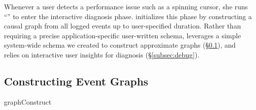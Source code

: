 Whenever a user detects a performance issue such as a spinning cursor, she runs
``'' to enter the interactive diagnosis phase.  \xxx initializes
this phase by constructing a causal graph from all logged events up to
user-specified duration.  Rather than requiring a precise application-specific
user-written schema, \xxx leverages a simple system-wide schema we created to
construct approximate graphs (\S\ref{subsec:graph}), and relies on interactive
user insights for diagnosis (\S\ref{subsec:debug}).

\subsection{Constructing Event Graphs} \label{subsec:graph}
 {graphConstruct}

